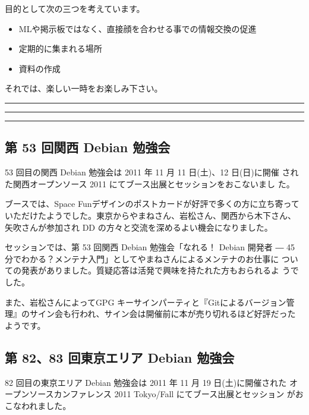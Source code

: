 \documentclass[mingoth,a4paper]{jsarticle}
\begin{document}
 目的として次の三つを考えています。
 \begin{itemize}
  \item MLや掲示板ではなく、直接顔を合わせる事での情報交換の促進
  \item 定期的に集まれる場所
  \item 資料の作成
 \end{itemize}

 それでは、楽しい一時をお楽しみ下さい。

\newpage

\begin{minipage}[b]{0.2\hsize}
 {}
\end{minipage}
\begin{minipage}[b]{0.8\hsize}
\hrule
\vspace{2mm}
\hrule
\setcounter{tocdepth}{1}
\tableofcontents
\vspace{2mm}
\hrule
\end{minipage}


\subsection{第 53 回関西 Debian 勉強会}
53 回目の関西 Debian 勉強会は 2011 年 11 月 11 日(土)、12 日(日)に開催
された関西オープンソース 2011 にてブース出展とセッションをおこないまし
た。

ブースでは、Space Funデザインのポストカードが好評で多くの方に立ち寄って
いただけたようでした。東京からやまねさん、岩松さん、関西から木下さん、
矢吹さんが参加され DD の方々と交流を深めるよい機会になりました。

セッションでは、第 53 回関西 Debian 勉強会「なれる！ Debian 開発者 ―
45 分でわかる？メンテナ入門」としてやまねさんによるメンテナのお仕事に
ついての発表がありました。質疑応答は活発で興味を持たれた方もおられるよ
うでした。

また、岩松さんによってGPG キーサインパーティと『Gitによるバージョン管
理』のサイン会も行われ、サイン会は開催前に本が売り切れるほど好評だった
ようです。

\subsection{第 82、83 回東京エリア Debian 勉強会}
82 回目の東京エリア Debian 勉強会は 2011 年 11 月 19 日(土)に開催された
オープンソースカンファレンス 2011 Tokyo/Fall にてブース出展とセッション
がおこなわれました。
\end{document}
